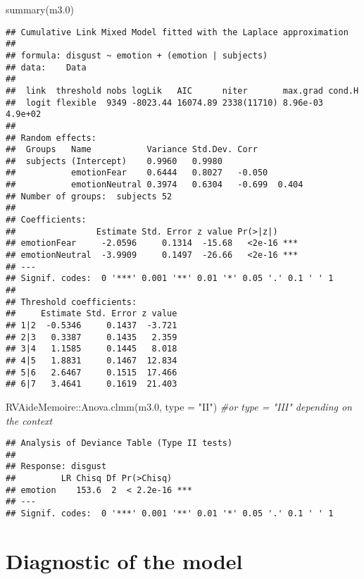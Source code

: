 \documentclass[
]{article}
\newenvironment{Shaded}{\begin{snugshade}}{\end{snugshade}}
\newcommand{\AttributeTok}[1]{\textcolor[rgb]{0.77,0.63,0.00}{#1}}
\newcommand{\CommentTok}[1]{\textcolor[rgb]{0.56,0.35,0.01}{\textit{#1}}}
\newcommand{\FloatTok}[1]{\textcolor[rgb]{0.00,0.00,0.81}{#1}}
\newcommand{\FunctionTok}[1]{\textcolor[rgb]{0.00,0.00,0.00}{#1}}
\newcommand{\NormalTok}[1]{#1}
\newcommand{\SpecialCharTok}[1]{\textcolor[rgb]{0.00,0.00,0.00}{#1}}
\newcommand{\StringTok}[1]{\textcolor[rgb]{0.31,0.60,0.02}{#1}}
\begin{document}
\begin{Shaded}
\begin{Highlighting}[]
\FunctionTok{summary}\NormalTok{(m3}\FloatTok{.0}\NormalTok{)}
\end{Highlighting}
\end{Shaded}

\begin{verbatim}
## Cumulative Link Mixed Model fitted with the Laplace approximation
## 
## formula: disgust ~ emotion + (emotion | subjects)
## data:    Data
## 
##  link  threshold nobs logLik   AIC      niter       max.grad cond.H 
##  logit flexible  9349 -8023.44 16074.89 2338(11710) 8.96e-03 4.9e+02
## 
## Random effects:
##  Groups   Name           Variance Std.Dev. Corr          
##  subjects (Intercept)    0.9960   0.9980                 
##           emotionFear    0.6444   0.8027   -0.050        
##           emotionNeutral 0.3974   0.6304   -0.699  0.404 
## Number of groups:  subjects 52 
## 
## Coefficients:
##                Estimate Std. Error z value Pr(>|z|)    
## emotionFear     -2.0596     0.1314  -15.68   <2e-16 ***
## emotionNeutral  -3.9909     0.1497  -26.66   <2e-16 ***
## ---
## Signif. codes:  0 '***' 0.001 '**' 0.01 '*' 0.05 '.' 0.1 ' ' 1
## 
## Threshold coefficients:
##     Estimate Std. Error z value
## 1|2  -0.5346     0.1437  -3.721
## 2|3   0.3387     0.1435   2.359
## 3|4   1.1585     0.1445   8.018
## 4|5   1.8831     0.1467  12.834
## 5|6   2.6467     0.1515  17.466
## 6|7   3.4641     0.1619  21.403
\end{verbatim}

\begin{Shaded}
\begin{Highlighting}[]
\NormalTok{RVAideMemoire}\SpecialCharTok{::}\FunctionTok{Anova.clmm}\NormalTok{(m3}\FloatTok{.0}\NormalTok{, }\AttributeTok{type =} \StringTok{"II"}\NormalTok{) }\CommentTok{\#or type = "III" depending on the context}
\end{Highlighting}
\end{Shaded}

\begin{verbatim}
## Analysis of Deviance Table (Type II tests)
## 
## Response: disgust
##         LR Chisq Df Pr(>Chisq)    
## emotion    153.6  2  < 2.2e-16 ***
## ---
## Signif. codes:  0 '***' 0.001 '**' 0.01 '*' 0.05 '.' 0.1 ' ' 1
\end{verbatim}

\hypertarget{diagnostic-of-the-model}{%
\section{Diagnostic of the model}\label{diagnostic-of-the-model}}
\end{document}

